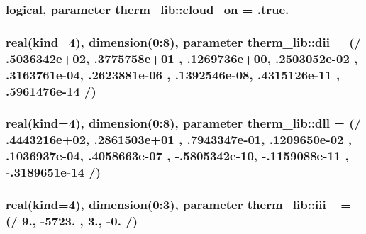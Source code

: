 \subsubsection[{\texorpdfstring{cloud\+\_\+on}{cloud_on}}]{\setlength{\rightskip}{0pt plus 5cm}logical, parameter therm\+\_\+lib\+::cloud\+\_\+on = .true.}\hypertarget{namespacetherm__lib_a7761745573e57bcf109498771693bc48}{}\label{namespacetherm__lib_a7761745573e57bcf109498771693bc48}
\subsubsection[{\texorpdfstring{dii}{dii}}]{\setlength{\rightskip}{0pt plus 5cm}real(kind=4), dimension(0\+:8), parameter therm\+\_\+lib\+::dii = (/ .\+5036342e+02, .\+3775758e+01 , .\+1269736e+00, .\+2503052e-\/02 , .\+3163761e-\/04, .\+2623881e-\/06 , .\+1392546e-\/08, .\+4315126e-\/11 , .\+5961476e-\/14 /)}\hypertarget{namespacetherm__lib_ac6f7b02070a3ef627b731ecd1b7afb1a}{}\label{namespacetherm__lib_ac6f7b02070a3ef627b731ecd1b7afb1a}
\subsubsection[{\texorpdfstring{dll}{dll}}]{\setlength{\rightskip}{0pt plus 5cm}real(kind=4), dimension(0\+:8), parameter therm\+\_\+lib\+::dll = (/ .\+4443216e+02, .\+2861503e+01 , .\+7943347e-\/01, .\+1209650e-\/02 , .\+1036937e-\/04, .\+4058663e-\/07 , -\/.\+5805342e-\/10, -\/.\+1159088e-\/11 , -\/.\+3189651e-\/14 /)}\hypertarget{namespacetherm__lib_acfbfc8c511318be0ac3c435bec00f876}{}\label{namespacetherm__lib_acfbfc8c511318be0ac3c435bec00f876}
\subsubsection[{\texorpdfstring{iii\+\_\+7}{iii_7}}]{\setlength{\rightskip}{0pt plus 5cm}real(kind=4), dimension(0\+:3), parameter therm\+\_\+lib\+::iii\+\_ = (/ 9., -\/5723. , 3., -\/0. /)}\hypertarget{namespacetherm__lib_af62776bc58906738f54b9b6be6b672d6}{}\label{namespacetherm__lib_af62776bc58906738f54b9b6be6b672d6}
